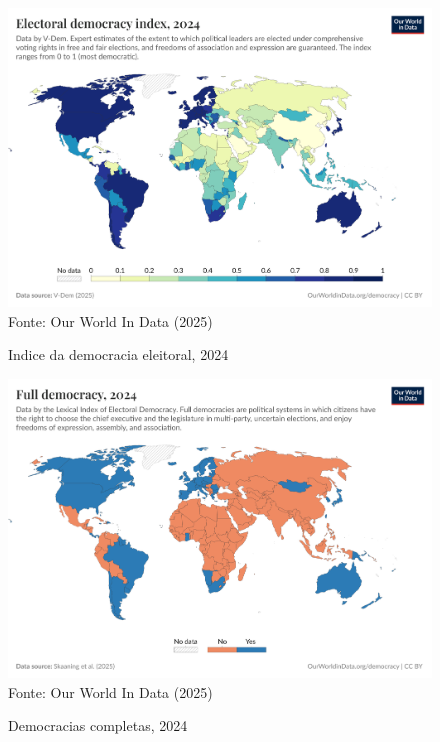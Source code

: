 \begin{figure}[ht]
    \centering
    \caption{Indice da democracia eleitoral, 2024}
    \includegraphics[width=1\linewidth]{figuras/democracia/electoral-democracy-index.png}
    \label{fig:electoral-democracy-index}
    \footnotesize{Fonte: Our World In Data (2025)}
\end{figure}

\begin{figure}[ht]
    \centering
    \caption{Democracias completas, 2024}
    \includegraphics[width=1\linewidth]{figuras/democracia/full-democracy-lexical.png}
    \label{fig:full-democracy-lexical}
    \footnotesize{Fonte: Our World In Data (2025)}
\end{figure}


